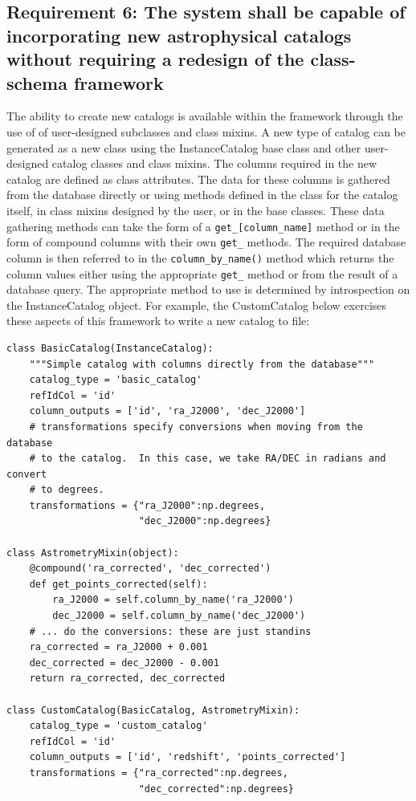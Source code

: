 \documentclass[]{article}
\begin{document}
{\subsection{Requirement 6: The system shall be capable of incorporating new astrophysical catalogs without requiring
a redesign of the class-schema framework}
The ability to create new catalogs is available within the framework through the use of of user-designed subclasses and class mixins. A new type of catalog can be generated as a new class using the InstanceCatalog base class and other user-designed catalog classes and class mixins. The columns required in the new catalog are defined as class attributes. The data for these columns is gathered from the database directly or using methods defined in the class
for the catalog itself, in class mixins designed by the user, or in the base classes. These data gathering methods can take the form of a {\tt get\_[column\_name]} method or in the form of compound columns with their own {\tt get\_} methods. The required database column is then referred to in the {\tt column\_by\_name()} method which returns the column values either using the appropriate {\tt get\_} method or from the result of a database query. The appropriate method to use is determined by
introspection on the InstanceCatalog object. For example, the CustomCatalog below exercises these aspects of this framework to write a new catalog to file:

\begin{verbatim}
class BasicCatalog(InstanceCatalog):
    """Simple catalog with columns directly from the database"""
    catalog_type = 'basic_catalog'
    refIdCol = 'id'
    column_outputs = ['id', 'ra_J2000', 'dec_J2000']
    # transformations specify conversions when moving from the database
    # to the catalog.  In this case, we take RA/DEC in radians and convert
    # to degrees.
    transformations = {"ra_J2000":np.degrees,
                       "dec_J2000":np.degrees}

class AstrometryMixin(object):
    @compound('ra_corrected', 'dec_corrected')
    def get_points_corrected(self):
        ra_J2000 = self.column_by_name('ra_J2000')
        dec_J2000 = self.column_by_name('dec_J2000')
    # ... do the conversions: these are just standins
    ra_corrected = ra_J2000 + 0.001
    dec_corrected = dec_J2000 - 0.001
    return ra_corrected, dec_corrected

class CustomCatalog(BasicCatalog, AstrometryMixin):
    catalog_type = 'custom_catalog'
    refIdCol = 'id'
    column_outputs = ['id', 'redshift', 'points_corrected']
    transformations = {"ra_corrected":np.degrees,
                       "dec_corrected":np.degrees}


\end{verbatim}}
\end{document}
